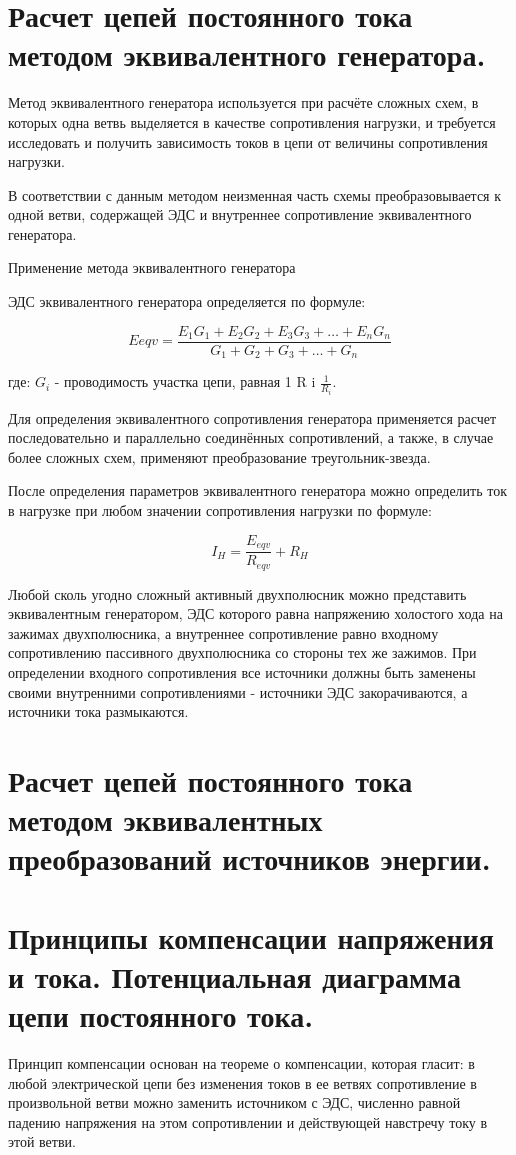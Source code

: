 \documentclass[a4paper, 12pt]{article}
\begin{document}
\section{Расчет цепей постоянного тока методом эквивалентного генератора.}
Метод эквивалентного генератора используется при расчёте сложных схем, в которых одна ветвь выделяется в качестве сопротивления нагрузки, и требуется исследовать и получить зависимость токов в цепи от величины сопротивления нагрузки.

В соответствии с данным методом неизменная часть схемы преобразовывается к одной ветви, содержащей ЭДС и внутреннее сопротивление эквивалентного генератора.

Применение метода эквивалентного генератора

ЭДС эквивалентного генератора определяется по формуле:

\[
    E e q v ={\frac {{E_{1}G_{1}}+{E_{2}G_{2}}+{E_{3}G_{3}}+\ldots +{E_{n}G_{n}}}{G_{1}+G_{2}+G_{3}+\ldots +G_{n}}}
\]

где: $ G_{i} $ - проводимость участка цепи, равная 1 R i $ \frac{1}{R_i} $.

Для определения эквивалентного сопротивления генератора применяется расчет последовательно и параллельно соединённых сопротивлений, а также, в случае более сложных схем, применяют преобразование треугольник-звезда.

После определения параметров эквивалентного генератора можно определить ток в нагрузке при любом значении сопротивления нагрузки по формуле:

\[
    I_H = \frac{E_{eqv}}{R_{eqv}} + R_H
\]

Любой сколь угодно сложный активный двухполюсник можно представить эквивалентным генератором, ЭДС которого равна напряжению холостого хода на зажимах двухполюсника, а внутреннее сопротивление равно входному сопротивлению пассивного двухполюсника со стороны тех же зажимов. При определении входного сопротивления все источники должны быть заменены своими внутренними сопротивлениями - источники ЭДС закорачиваются, а источники тока размыкаются.
\section{Расчет цепей постоянного тока методом эквивалентных преобразований источников энергии.}
 
\section{Принципы компенсации напряжения и тока. Потенциальная диаграмма цепи постоянного тока.}
Принцип компенсации основан на теореме о компенсации, которая гласит: в любой электрической цепи без изменения токов в ее ветвях сопротивление в произвольной ветви можно заменить источником с ЭДС, численно равной падению напряжения на этом сопротивлении и действующей навстречу току в этой ветви.\\
\end{document}
